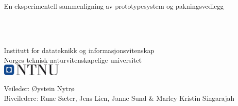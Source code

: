 \thispagestyle{empty}


\Huge{\textbf \thesisTitle}\\[1pc]
\Large{En eksperimentell sammenligning av prototypesystem og pakningsvedlegg}\\[1pc]

\begin{center}

\Large{\thesisAuthor}\\[1pc]
\Large{\thesisDate}\\[4pc]

\thesisType\\ [2pc]
Institutt for datateknikk og informasjonsvitenskap\\
Norges teknisk-naturvitenskapelige universitet \\ [2pc]
\includegraphics[width=3cm]{fig/logo_ntnu_u-slagord.png} \\[3pc]
\end{center}


\vfill


\small{Veileder: Øystein Nytrø \\
Biveiledere: Rune Sæter, Jens Lien, Janne Sund \& Marley Kristin Singarajah}

